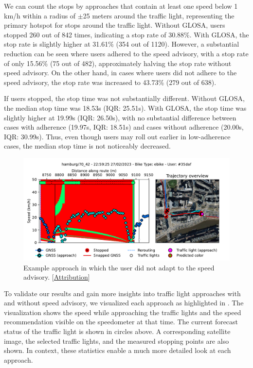 We can count the stops by approaches that contain at least one speed below 1 km/h within a radius of $\pm$25 meters around the traffic light, representing the primary hotspot for stops around the traffic light. Without GLOSA, users stopped 260 out of 842 times, indicating a stop rate of 30.88\%. With GLOSA, the stop rate is slightly higher at 31.61\% (354 out of 1120). However, a substantial reduction can be seen where users adhered to the speed advisory, with a stop rate of only 15.56\% (75 out of 482), approximately halving the stop rate without speed advisory. On the other hand, in cases where users did not adhere to the speed advisory, the stop rate was increased to 43.73\% (279 out of 638).

If users stopped, the stop time was not substantially different. Without GLOSA, the median stop time was 18.53s (IQR: 25.51s). With GLOSA, the stop time was slightly higher at 19.99s (IQR: 26.50s), with no substantial difference between cases with adherence (19.97s, IQR: 18.51s) and cases without adherence (20.00s, IQR: 30.99s). Thus, even though users may roll out earlier in low-adherence cases, the median stop time is not noticeably decreased.

\begin{figure}[t]
\caption{Example approach in which the user did not adapt to the speed advisory. [\hyperref[attribution]{Attribution}]}\label{fig:example-trajectory-not-adapted}
\includegraphics[width=\linewidth]{images/example-trajectory-not-adapted.pdf}
\end{figure}

To validate our results and gain more insights into traffic light approaches with and without speed advisory, we visualized each approach as highlighted in . The visualization shows the speed while approaching the traffic lights and the speed recommendation visible on the speedometer at that time. The current forecast status of the traffic light is shown in circles above. A corresponding satellite image, the selected traffic lights, and the measured stopping points are also shown. In context, these statistics enable a much more detailed look at each approach.


